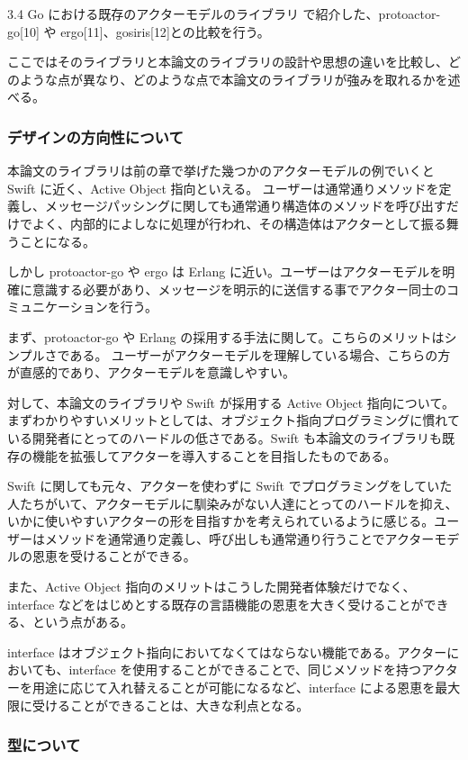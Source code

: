 3.4 Go における既存のアクターモデルのライブラリ で紹介した、protoactor-go{[}10{]} や ergo{[}11{]}、gosiris{[}12{]}との比較を行う。

ここではそのライブラリと本論文のライブラリの設計や思想の違いを比較し、どのような点が異なり、どのような点で本論文のライブラリが強みを取れるかを述べる。

\subsubsection{デザインの方向性について}

本論文のライブラリは前の章で挙げた幾つかのアクターモデルの例でいくと
Swift に近く、Active Object 指向といえる。
ユーザーは通常通りメソッドを定義し、メッセージパッシングに関しても通常通り構造体のメソッドを呼び出すだけでよく、内部的によしなに処理が行われ、その構造体はアクターとして振る舞うことになる。

しかし protoactor-go や ergo は Erlang
に近い。ユーザーはアクターモデルを明確に意識する必要があり、メッセージを明示的に送信する事でアクター同士のコミュニケーションを行う。

まず、protoactor-go や Erlang
の採用する手法に関して。こちらのメリットはシンプルさである。
ユーザーがアクターモデルを理解している場合、こちらの方が直感的であり、アクターモデルを意識しやすい。

対して、本論文のライブラリや Swift が採用する Active Object
指向について。まずわかりやすいメリットとしては、オブジェクト指向プログラミングに慣れている開発者にとってのハードルの低さである。Swift
も本論文のライブラリも既存の機能を拡張してアクターを導入することを目指したものである。

Swift に関しても元々、アクターを使わずに Swift
でプログラミングをしていた人たちがいて、アクターモデルに馴染みがない人達にとってのハードルを抑え、いかに使いやすいアクターの形を目指すかを考えられているように感じる。ユーザーはメソッドを通常通り定義し、呼び出しも通常通り行うことでアクターモデルの恩恵を受けることができる。

また、Active Object
指向のメリットはこうした開発者体験だけでなく、interface
などをはじめとする既存の言語機能の恩恵を大きく受けることができる、という点がある。

interface
はオブジェクト指向においてなくてはならない機能である。アクターにおいても、interface
を使用することができることで、同じメソッドを持つアクターを用途に応じて入れ替えることが可能になるなど、interface
による恩恵を最大限に受けることができることは、大きな利点となる。

\subsubsection{型について}

